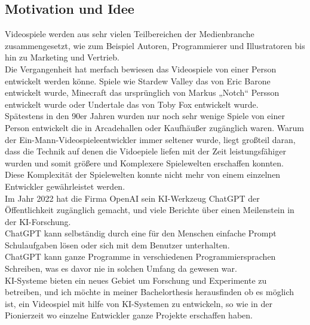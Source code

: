 \documentclass[10pt,a4paper,bibliography=totocnumbered,listof=totocnumbered]{scrartcl}
\begin{document}
\subsection{Motivation und Idee}
Videospiele werden aus sehr vielen Teilbereichen der Medienbranche zusammengesetzt, wie zum Beispiel Autoren, Programmierer und Illustratoren bis hin zu Marketing und Vertrieb.
\\
Die Vergangenheit hat merfach bewiesen das Videospiele von einer Person entwickelt werden könne. Spiele wie Stardew Valley das von Eric Barone entwickelt wurde, Minecraft das ursprünglich von Markus „Notch“ Persson entwickelt wurde oder Undertale das von Toby Fox entwickelt wurde.
\\
Spätestens in den 90er Jahren wurden nur noch sehr wenige Spiele von einer Person entwickelt die in Arcadehallen oder Kaufhäußer zugänglich waren.
Warum der Ein-Mann-Videospieleentwickler immer seltener wurde, liegt großteil daran, dass die Technik auf denen die Vidoepiele liefen mit der Zeit leistungsfähiger wurden und somit größere und Komplexere Spielewelten erschaffen konnten.
\\
Diese Komplexität der Spielewelten konnte nicht mehr von einem einzelnen Entwickler gewährleistet werden.
\\
Im Jahr 2022 hat die Firma OpenAI sein KI-Werkzeug ChatGPT der Öffentlichkeit zugänglich gemacht, und viele Berichte über einen Meilenstein in der KI-Forschung.
\\
ChatGPT kann selbständig durch eine für den Menschen einfache Prompt Schulaufgaben lösen oder sich mit dem Benutzer unterhalten.
\\
ChatGPT kann ganze Programme in verschiedenen Programmiersprachen Schreiben, was es davor nie in solchen Umfang da gewesen war.
\\
KI-Systeme bieten ein neues Gebiet um Forschung und Experimente zu betreiben, und ich möchte in meiner Bachelorthesis herausfinden ob es möglich ist, ein Videospiel mit hilfe von KI-Systemen zu entwickeln, so wie in der Pionierzeit wo einzelne Entwickler ganze Projekte erschaffen haben.
\\
\end{document}
